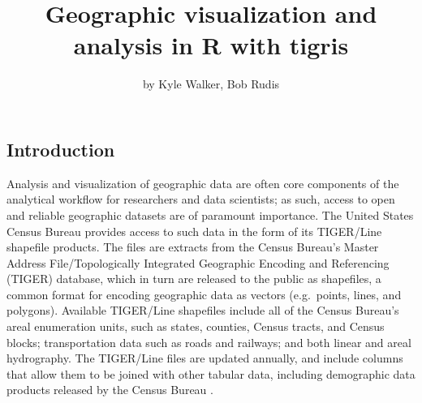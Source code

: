 \title{Geographic visualization and analysis in R with tigris}
\author{by Kyle Walker, Bob Rudis}

\maketitle


\subsection{Introduction}\label{introduction}

Analysis and visualization of geographic data are often core components
of the analytical workflow for researchers and data scientists; as such,
access to open and reliable geographic datasets are of paramount
importance. The United States Census Bureau provides access to such data
in the form of its TIGER/Line shapefile products. The files are extracts
from the Census Bureau's Master Address File/Topologically Integrated
Geographic Encoding and Referencing (TIGER) database, which in turn are
released to the public as shapefiles, a common format for encoding
geographic data as vectors (e.g.~points, lines, and polygons). Available
TIGER/Line shapefiles include all of the Census Bureau's areal
enumeration units, such as states, counties, Census tracts, and Census
blocks; transportation data such as roads and railways; and both linear
and areal hydrography. The TIGER/Line files are updated annually, and
include columns that allow them to be joined with other tabular data,
including demographic data products released by the Census Bureau
\citep{Census}.

